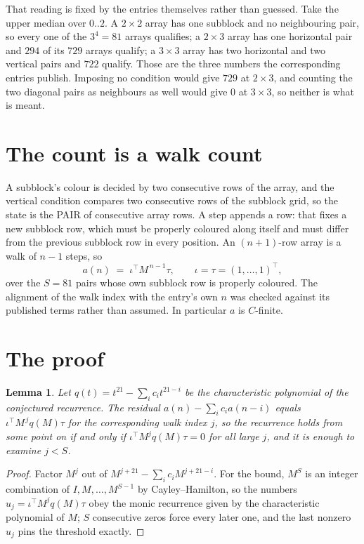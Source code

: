 \documentclass[11pt,a4paper]{article}
\theoremstyle{plain}
\newtheorem{lemma}[theorem]{Lemma}
\theoremstyle{definition}
\begin{document}
That reading is fixed by the entries themselves rather than guessed. Take the upper median
over $0..2$. A $2\times2$ array has one subblock and no neighbouring pair, so every one of the
$3^4=81$ arrays qualifies; a $2\times3$ array has one horizontal pair and $294$ of its $729$
arrays qualify; a $3\times3$ array has two horizontal and two vertical pairs and $722$
qualify. Those are the three numbers the corresponding entries publish. Imposing no condition
would give $729$ at $2\times3$, and counting the two diagonal pairs as neighbours as well
would give $0$ at $3\times3$, so neither is what is meant.

\section{The count is a walk count}

A subblock's colour is decided by two consecutive rows of the array, and
the vertical condition compares two consecutive rows of the subblock grid, so the state is the
PAIR of consecutive array rows. A step appends a row: that fixes a new subblock row, which
must be properly coloured along itself and must differ from the previous subblock row in every
position. An $(n+1)$-row array is a walk of $n-1$ steps, so
\[
a(n)\;=\;\iota^{\!\top}M^{\,n-1}\tau,\qquad\iota=\tau=(1,\dots,1)^{\!\top},
\]
over the $S=81$ pairs whose own subblock row is properly coloured.
The alignment of the walk index with the entry's own $n$ was checked against its published
terms rather than assumed. In particular $a$ is $C$-finite.

\section{The proof}

\begin{lemma}\label{lem:crit}
Let $q(t)=t^{21}-\sum_i c_it^{21-i}$ be the characteristic polynomial of the
conjectured recurrence. The residual $a(n)-\sum_ic_ia(n-i)$ equals
$\iota^{\!\top}M^{\,j}q(M)\tau$ for the corresponding walk index $j$, so the recurrence
holds from some point on if and only if $\iota^{\!\top}M^{j}q(M)\tau=0$ for all large $j$,
and it is enough to examine $j<S$.
\end{lemma}

\begin{proof}
Factor $M^{j}$ out of $M^{j+21}-\sum_ic_iM^{j+21-i}$. For the bound, $M^{S}$
is an integer combination of $I,M,\dots,M^{S-1}$ by Cayley--Hamilton, so the numbers
$u_j=\iota^{\!\top}M^{j}q(M)\tau$ obey the monic recurrence given by the characteristic
polynomial of $M$; $S$ consecutive zeros force every later one, and the last nonzero $u_j$
pins the threshold exactly.
\end{proof}
\end{document}
